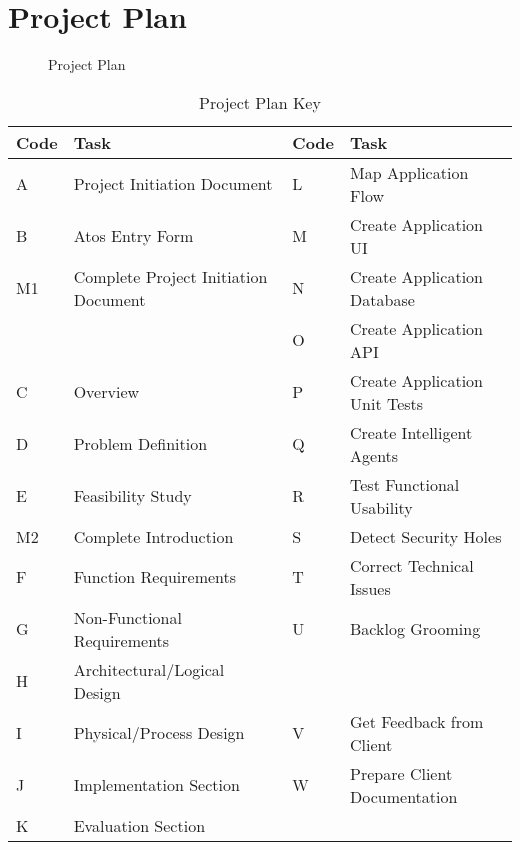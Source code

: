 \section{Project Plan}

\begin{figure}
  \centering
  \begin{minipage}{14cm}
    \centering
    
    \caption{Project Plan}
    \label{fig:project_plan}
  \end{minipage}
\end{figure}

\begin{table}
  \caption[Project Plan Key]{Project Plan Key \hfill}
  \label{tab:runtime}
  \begin{tabular*}{14.0cm}{p{1.0cm}p{6.0cm}p{1.0cm}p{6.0cm}}
    \toprule
    Code & Task & Code & Task \\
    \midrule
    A & Project Initiation Document & L & Map Application Flow \\
    B & Atos Entry Form & M & Create Application UI \\
    M1 & Complete Project Initiation Document & N & Create Application Database \\
     & & O & Create Application API \\
    C & Overview & P & Create Application Unit Tests \\
    D & Problem Definition & Q & Create Intelligent Agents \\
    E & Feasibility Study & R & Test Functional Usability \\
    M2 & Complete Introduction & S & Detect Security Holes \\
    F & Function Requirements & T & Correct Technical Issues \\
    G & Non-Functional Requirements & U & Backlog Grooming \\
    H & Architectural/Logical Design & & \\
    I & Physical/Process Design & V & Get Feedback from Client \\
    J & Implementation Section & W & Prepare Client Documentation \\
    K & Evaluation Section \\
    \bottomrule
  \end{tabular*}
\end{table}
